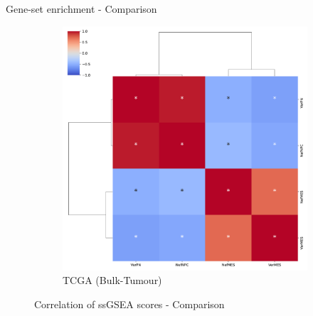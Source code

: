 \documentclass[aspectratio=169,9pt]{beamer}
\begin{document}
\begin{frame}{Gene-set enrichment - Comparison}
\begin{adjustwidth}{-5cm}{-5cm}
\begin{figure}
\begin{subfigure}[c]{0.48\textwidth}
                    \includegraphics[width=\textwidth]{ssGSEA_TCGA_corrplot_2D}
                    \caption{TCGA (Bulk-Tumour)}
                \end{subfigure}
                \caption{Correlation of ssGSEA scores - Comparison}
            \end{figure}
        \end{adjustwidth}
    \end{frame}
\end{document}
